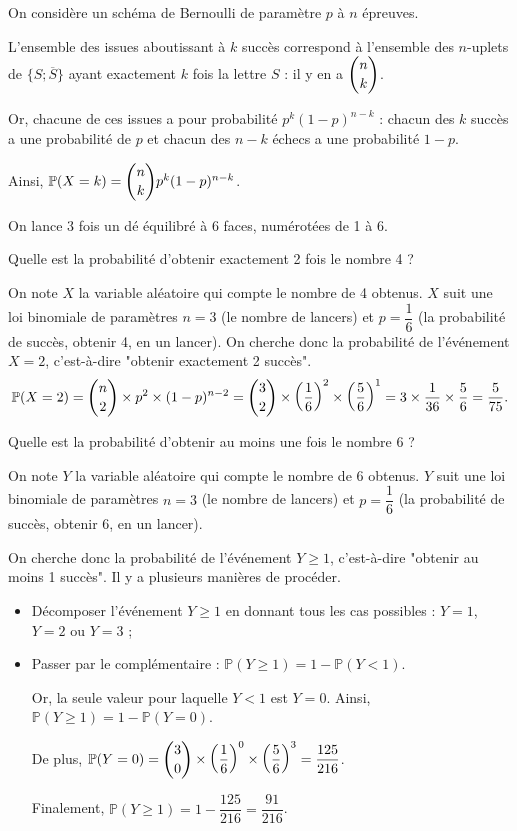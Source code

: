 \documentclass[11pt,fleqn, openany]{book} %
\begin{document}
\begin{demonstration}On considère un schéma de Bernoulli de paramètre $p$ à $n$ épreuves. 

L'ensemble des issues aboutissant à $k$ succès correspond à l'ensemble des $n$-uplets de $\{ S ; \overline{S} \}$ ayant exactement $k$ fois la lettre $S$ : il y en a $\dbinom{n}{k}$. 

Or, chacune de ces issues a pour probabilité $p^k(1-p)^{n-k}$ : chacun des $k$ succès a une probabilité de $p$ et chacun des $n-k$ échecs a une probabilité $1-p$. 

Ainsi, $\mathbb{P}(X=k)=\dbinom{n}{k}p^k(1-p)^{n-k}$.\end{demonstration}


\begin{example} On lance 3 fois un dé équilibré à 6 faces, numérotées de 1 à 6.

Quelle est la probabilité d'obtenir exactement 2 fois le nombre 4 ? 

On note $X$ la variable aléatoire qui compte le nombre de 4 obtenus. $X$ suit une loi binomiale de paramètres $n=3$ (le nombre de lancers) et $p=\dfrac{1}{6}$ (la probabilité de succès, obtenir 4, en un lancer). On cherche donc la probabilité de l'événement $X=2$, c'est-à-dire "obtenir exactement 2 succès".
\[ \mathbb{P}(X=2)=\dbinom{n}{2} \times p^2 \times (1-p)^{n-2}=\dbinom{3}{2} \times \left(\dfrac{1}{6}\right)^2 \times \left(\dfrac{5}{6}\right)^1=3\times \dfrac{1}{36}\times \dfrac{5}{6}=\dfrac{5}{75}.\]

Quelle est la probabilité d'obtenir au moins une fois le nombre 6 ? 

On note $Y$ la variable aléatoire qui compte le nombre de 6 obtenus. $Y$ suit une loi binomiale de paramètres $n=3$ (le nombre de lancers) et $p=\dfrac{1}{6}$ (la probabilité de succès, obtenir 6, en un lancer). 

On cherche donc la probabilité de l'événement $Y\geqslant 1$, c'est-à-dire "obtenir au moins 1 succès". Il y a plusieurs manières de procéder.
\begin{itemize}
\item Décomposer l'événement $Y \geqslant 1$ en donnant tous les cas possibles : $Y=1$, $Y=2$ ou $Y=3$ ;
\item Passer par le complémentaire : $\mathbb{P}(Y \geqslant 1) = 1 - \mathbb{P}(Y < 1)$. 

Or, la seule valeur pour laquelle $Y<1$ est $Y=0$. Ainsi, $\mathbb{P}(Y \geqslant 1)=1- \mathbb{P}(Y=0)$. 

De plus, $\mathbb{P}(Y=0)=\dbinom{3}{0} \times \left(\dfrac{1}{6}\right)^0 \times \left(\dfrac{5}{6}\right)^3=\dfrac{125}{216}$. 

Finalement, $\mathbb{P}(Y\geqslant 1)=1-\dfrac{125}{216}=\dfrac{91}{216}$.
\end{itemize}\end{example}
\end{document}
